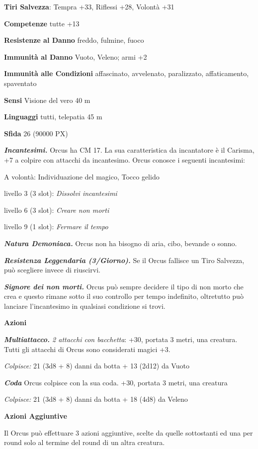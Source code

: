 \begin{multicols}{2}
\textbf{Tiri Salvezza}: Tempra +33, Riflessi +28, Volontà +31

\textbf{Competenze} tutte +13

\textbf{Resistenze al Danno} freddo, fulmine, fuoco

\textbf{Immunità al Danno} Vuoto, Veleno; armi +2

\textbf{Immunità alle Condizioni} affascinato, avvelenato, paralizzato, affaticamento, spaventato

\textbf{Sensi} Visione del vero 40 m

\textbf{Linguaggi} tutti, telepatia 45 m

\textbf{Sfida} 26 (90000 PX)

\textit{\textbf{Incantesimi.}} Orcus ha CM 17. La sua caratteristica da incantatore è il Carisma, +7 a colpire con attacchi da incantesimo. Orcus conosce i seguenti incantesimi:

A volontà: Individuazione del magico, Tocco gelido

livello 3 (3 slot): \textit{Dissolvi incantesimi}

livello 6 (3 slot): \textit{Creare non morti}

livello 9 (1 slot): \textit{Fermare il tempo}

\textit{\textbf{Natura Demoniaca.}} Orcus non ha bisogno di aria, cibo, bevande o sonno.

\textit{\textbf{Resistenza Leggendaria (3/Giorno).}} Se il Orcus fallisce un Tiro Salvezza, può scegliere invece di riuscirvi.

\textit{\textbf{Signore dei non morti.}} Orcus può sempre decidere il tipo di non morto che crea e questo rimane sotto il suo controllo per tempo indefinito, oltretutto può lanciare l'incantesimo in qualsiasi condizione si trovi.

\textbf{Azioni}

\textit{\textbf{Multiattacco.} 2 attacchi con bacchetta}: +30, portata 3 metri, una creatura. Tutti gli attacchi di Orcus sono considerati magici +3.

\textit{Colpisce:} 21 (3d8 + 8) danni da botta + 13 (2d12) da Vuoto

\textit{\textbf{Coda}} Orcus colpisce con la sua coda. +30, portata 3 metri, una creatura

\textit{Colpisce:} 21 (3d8 + 8) danni da botta + 18 (4d8) da Veleno

\textbf{Azioni Aggiuntive}

Il Orcus può effettuare 3 azioni aggiuntive, scelte da quelle sottostanti ed una per round solo al termine del round di un altra creatura.


\end{multicols}
